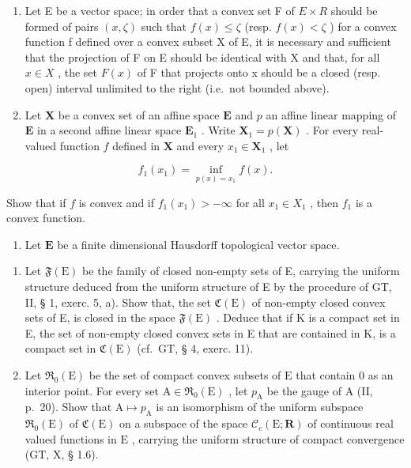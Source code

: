\begin{enumerate}
\item
  Let E be a vector space; in order that a convex set F of \(E \times R\) should be formed of pairs \((x, \zeta)\) such that \(f(x) \leqslant \zeta\) (resp. \(f(x) < \zeta\) ) for a convex function f defined over a convex subset X of E, it is necessary and sufficient that the projection of F on E should be identical with X and that, for all \(x \in X\) , the set \(F(x)\) of F that projects onto x should be a closed (resp. open) interval unlimited to the right (i.e.~not bounded above).
\item
  Let \(\mathbf{X}\) be a convex set of an affine space \(\mathbf{E}\) and \(p\) an affine linear mapping of \(\mathbf{E}\) in a second affine linear space \(\mathbf{E}_1\) . Write \(\mathbf{X}_1 = p(\mathbf{X})\) . For every real-valued function \(f\) defined in \(\mathbf{X}\) and every \(x_1 \in \mathbf{X}_1\) , let
\end{enumerate}

\[
f _ {1} (x _ {1}) = \inf _ {p (x) = x _ {1}} f (x).
\]

Show that if \(f\) is convex and if \(f_{1}(x_{1}) > -\infty\) for all \(x_{1} \in X_{1}\) , then \(f_{1}\) is a convex function.

\begin{enumerate}
\def\labelenumi{\arabic{enumi})}
\setcounter{enumi}{38}
\tightlist
\item
  Let \(\mathbf{E}\) be a finite dimensional Hausdorff topological vector space.
\end{enumerate}

\begin{enumerate}
\def\labelenumi{\alph{enumi})}
\item
  Let \(\mathfrak{F}(\mathrm{E})\) be the family of closed non-empty sets of E, carrying the uniform structure deduced from the uniform structure of E by the procedure of GT, II, § 1, exerc. 5, a). Show that, the set \(\mathfrak{C}(\mathrm{E})\) of non-empty closed convex sets of E, is closed in the space \(\mathfrak{F}(\mathrm{E})\) . Deduce that if K is a compact set in E, the set of non-empty closed convex sets in E that are contained in K, is a compact set in \(\mathfrak{C}(\mathrm{E})\) (cf.~GT, § 4, exerc. 11).
\item
  Let \(\mathfrak{R}_0(\mathrm{E})\) be the set of compact convex subsets of \(\mathrm{E}\) that contain 0 as an interior point. For every set \(\mathrm{A} \in \mathfrak{R}_0(\mathrm{E})\) , let \(p_{\mathrm{A}}\) be the gauge of \(\mathrm{A}\) (II, p.~20). Show that \(\mathrm{A} \mapsto p_{\mathrm{A}}\) is an isomorphism of the uniform subspace \(\mathfrak{R}_0(\mathrm{E})\) of \(\mathfrak{C}(\mathrm{E})\) on a subspace of the space \(\mathcal{C}_{c}(\mathrm{E};\mathbf{R})\) of continuous real valued functions in \(\mathrm{E}\) , carrying the uniform structure of compact convergence (GT, X, § 1.6).
\end{enumerate}

